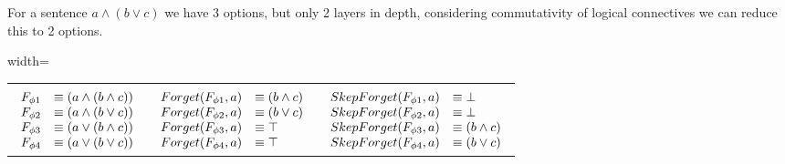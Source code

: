 For a sentence $a \land (b \lor c)$ we have 3 options, but only 2 layers in depth, considering commutativity of logical connectives we can reduce this to 2 options.\\\begin{adjustbox}{width=\textwidth}
\begin{tabular}{ c  c  c }
 &  &  \\
$\begin{array}{l l}
F_{\phi1} &\equiv (a \land (b \land c))\\
F_{\phi2} &\equiv (a \land (b \lor c))\\
F_{\phi3} &\equiv (a \lor (b \land c))\\
F_{\phi4} &\equiv (a \lor (b \lor c))\\
\end{array}$ & $\begin{array}{l l}
Forget(F_{\phi1},a) &\equiv (b \land c)\\
Forget(F_{\phi2},a) &\equiv (b \lor c)\\
Forget(F_{\phi3},a) &\equiv \top\\
Forget(F_{\phi4},a) &\equiv \top\\
\end{array}$ & $\begin{array}{l l}
SkepForget(F_{\phi1},a) &\equiv \bot\\
SkepForget(F_{\phi2},a) &\equiv \bot\\
SkepForget(F_{\phi3},a) &\equiv (b \land c)\\
SkepForget(F_{\phi4},a) &\equiv (b \lor c)\\
\end{array}$\\
\end{tabular}
\end{adjustbox}\newline\newline
